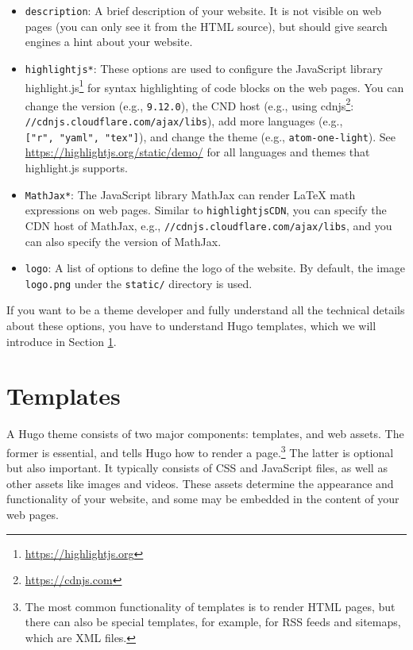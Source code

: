\documentclass[12pt,]{krantz}
\renewcommand{\href}[2]{#2\footnote{\url{#1}}}
\theoremstyle{definition}
\theoremstyle{definition}
\theoremstyle{definition}
\theoremstyle{remark}
\begin{document}
\begin{itemize}
  \begin{itemize}
  \item
    \texttt{description}: A brief description of your website. It is not
    visible on web pages (you can only see it from the HTML source), but
    should give search engines a hint about your website.
  \item
    \texttt{highlightjs*}: These options are used to configure the
    JavaScript library
    \href{https://highlightjs.org}{highlight.js} for syntax highlighting
    of code blocks on the web pages. You can change the version (e.g.,
    \texttt{9.12.0}), the CND host (e.g., using
    \href{https://cdnjs.com}{cdnjs}:
    \texttt{//cdnjs.cloudflare.com/ajax/libs}), add more languages
    (e.g., \texttt{{[}"r",\ "yaml",\ "tex"{]}}), and change the theme
    (e.g., \texttt{atom-one-light}). See
    \url{https://highlightjs.org/static/demo/} for all languages and
    themes that highlight.js supports.
  \item
    \texttt{MathJax*}: The JavaScript library MathJax can
    render LaTeX math expressions on web pages. Similar to
    \texttt{highlightjsCDN}, you can specify the CDN host of MathJax,
    e.g., \texttt{//cdnjs.cloudflare.com/ajax/libs}, and you can also
    specify the version of MathJax.
  \item
    \texttt{logo}: A list of options to define the logo of
    the website. By default, the image \texttt{logo.png} under the
    \texttt{static/} directory is used.
  \end{itemize}
\end{itemize}

If you want to be a theme developer and fully understand all the
technical details about these options, you have to understand Hugo
templates, which we will introduce in Section \ref{templates}.

\hypertarget{templates}{%
\section{Templates}\label{templates}}

A Hugo theme consists of two major components:
templates, and web assets. The former is essential, and
tells Hugo how to render a page.\footnote{The most common functionality
  of templates is to render HTML pages, but there can also be special
  templates, for example, for RSS feeds and sitemaps, which are XML
  files.} The latter is optional but also important. It typically
consists of CSS and JavaScript files, as well as other assets like
images and videos. These assets determine the appearance and
functionality of your website, and some may be embedded in the content
of your web pages.
\end{document}
